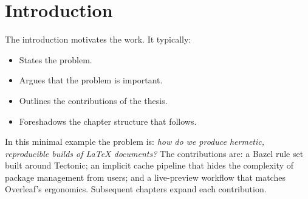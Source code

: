 \chapter{Introduction}
\label{ch:introduction}

The introduction motivates the work. It typically:

\begin{itemize}
    \item States the problem.
    \item Argues that the problem is important.
    \item Outlines the contributions of the thesis.
    \item Foreshadows the chapter structure that follows.
\end{itemize}

In this minimal example the problem is: \emph{how do we produce
hermetic, reproducible builds of LaTeX documents?} The contributions
are: a Bazel rule set built around Tectonic; an implicit cache
pipeline that hides the complexity of package management from
users; and a live-preview workflow that matches Overleaf's
ergonomics. Subsequent chapters expand each contribution.
